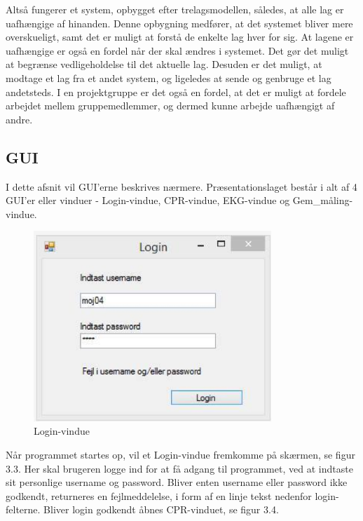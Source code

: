 Altså fungerer et system, opbygget efter trelagsmodellen, således, at alle lag er uafhængige af hinanden. Denne opbygning medfører, at det systemet bliver mere overskueligt, samt det er muligt at forstå de enkelte lag hver for sig. At lagene er uafhængige er også en fordel når der skal ændres i systemet. Det gør det muligt at begrænse vedligeholdelse til det aktuelle lag. Desuden er det muligt, at modtage et lag fra et andet system, og ligeledes at sende og genbruge et lag andetsteds. I en projektgruppe er det også en fordel, at det er muligt at fordele arbejdet mellem gruppemedlemmer, og dermed kunne arbejde uafhængigt af andre.



\subsection{GUI}
I dette afsnit vil GUI’erne beskrives nærmere. Præsentationslaget består i alt af 4 GUI’er eller vinduer - Login-vindue, CPR-vindue, EKG-vindue og Gem\_måling-vindue.

\begin{figure}[H]
	\centering
	\includegraphics[width=0.8\textwidth]{Figurer/Snip20150430_38}
	\caption{Login-vindue}
\end{figure}

Når programmet startes op, vil et Login-vindue fremkomme på skærmen, se figur 3.3. Her skal brugeren logge ind for at få adgang til programmet, ved at indtaste sit personlige username og password. Bliver enten username eller password ikke godkendt, returneres en fejlmeddelelse, i form af en linje tekst nedenfor login-felterne. Bliver login godkendt åbnes CPR-vinduet, se figur 3.4.

